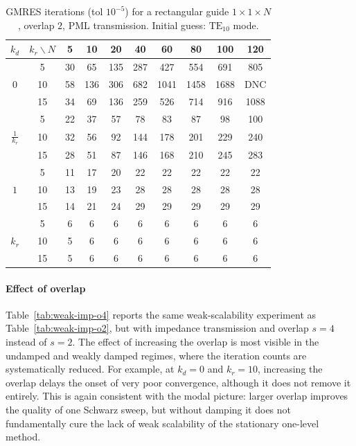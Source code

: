 \documentclass[smallextended]{svjour3}       %
\begin{document}
\begin{table}[h]
\centering
\setlength{\tabcolsep}{3pt}
\renewcommand{\arraystretch}{1.05}
\caption{GMRES iterations (tol \(10^{-5}\)) for a rectangular guide \(1\times 1\times N\), overlap \(2\),
PML transmission. Initial guess: $\mathrm{TE}_{10}$ mode.}
\label{tab:weak-pml-o2}
\begin{tabular}{|c||c|c|c|c|c|c|c|c|c|}
\hline
$k_d$ & $ k_r \backslash N$ & 5 & 10 & 20 & 40 & 60 & 80 & 100 & 120 \\
\hline
 & 5 & 30 & 65 & 135 & 287 & 427 & 554 & 691 & 805 \\
$0$ & 10 & 58 & 136 & 306 & 682 & 1041 & 1458 & 1688 & DNC \\
 & 15 & 34 & 69 & 136 & 259 & 526 & 714 & 916 & 1088 \\
\hline\hline
 & 5 & 22 & 37 & 57 & 78 & 83 & 87 & 98 & 100 \\
$\frac{1}{k_r}$ & 10 & 32 & 56 & 92 & 144 & 178 & 201 & 229 & 240 \\
 & 15 & 28 & 51 & 87 & 146 & 168 & 210 & 245 & 283 \\
\hline\hline
 & 5 & 11 & 17 & 20 & 22 & 22 & 22 & 22 & 22 \\
$1$ & 10 & 13 & 19 & 23 & 28 & 28 & 28 & 28 & 28 \\
 & 15 & 14 & 21 & 24 & 29 & 29 & 29 & 29 & 29 \\
\hline\hline
 & 5 & 6 & 6 & 6 & 6 & 6 & 6 & 6 & 6 \\
$k_r$ & 10 & 5 & 6 & 6 & 6 & 6 & 6 & 6 & 6 \\
 & 15 & 5 & 6 & 6 & 6 & 6 & 6 & 6 & 6 \\
\hline
\end{tabular}
\end{table}

\paragraph{Effect of overlap}
Table~\ref{tab:weak-imp-o4} reports the same weak-scalability experiment as
Table~\ref{tab:weak-imp-o2}, but with impedance transmission and overlap \(s=4\) instead of
\(s=2\). The effect of increasing the overlap is most visible in the undamped and weakly damped
regimes, where the iteration counts are systematically reduced. For example, at \(k_d=0\) and
\(k_r=10\), increasing the overlap delays the onset of very poor convergence, although it does not
remove it entirely. This is again consistent with the modal picture: larger overlap improves the
quality of one Schwarz sweep, but without damping it does not fundamentally cure the lack of weak
scalability of the stationary one-level method.
\end{document}
